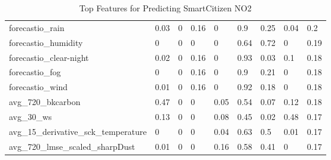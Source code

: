\begin{table}[]
\begin{tabular}{lllllllll}
forecastio\_rain                           & 0.03  & 0          & 0.16 & 0    & 0.9   & 0.25      & 0.04 & 0.2  \\
forecastio\_humidity                       & 0     & 0          & 0    & 0    & 0.64  & 0.72      & 0    & 0.19 \\
forecastio\_clear-night                    & 0.02  & 0          & 0.16 & 0    & 0.93  & 0.03      & 0.1  & 0.18 \\
forecastio\_fog                            & 0     & 0          & 0.16 & 0    & 0.9   & 0.21      & 0    & 0.18 \\
forecastio\_wind                           & 0.01  & 0          & 0.16 & 0    & 0.92  & 0.18      & 0    & 0.18 \\
avg\_720\_bkcarbon                         & 0.47  & 0          & 0    & 0.05 & 0.54  & 0.07      & 0.12 & 0.18 \\
avg\_30\_ws                                & 0.13  & 0          & 0    & 0.08 & 0.45  & 0.02      & 0.48 & 0.17 \\
avg\_15\_derivative\_sck\_temperature      & 0     & 0          & 0    & 0.04 & 0.63  & 0.5       & 0.01 & 0.17 \\
avg\_720\_lmse\_scaled\_sharpDust          & 0.01  & 0          & 0    & 0.16 & 0.58  & 0.41      & 0    & 0.17 \\
\bottomrule
\end{tabular}
\label{tab:sck_no2_top_features}
\caption{Top Features for Predicting SmartCitizen NO2}
\end{table}


